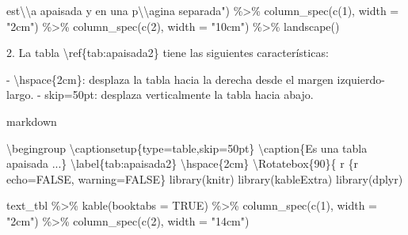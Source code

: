 \documentclass[11pt,a4paper,oneside,]{article}
\newenvironment{Shaded}{\begin{snugshade}}{\end{snugshade}}
\newcommand{\AttributeTok}[1]{\textcolor[rgb]{0.77,0.63,0.00}{#1}}
\newcommand{\DecValTok}[1]{\textcolor[rgb]{0.00,0.00,0.81}{#1}}
\newcommand{\FloatTok}[1]{\textcolor[rgb]{0.00,0.00,0.81}{#1}}
\newcommand{\NormalTok}[1]{#1}
\newcommand{\OtherTok}[1]{\textcolor[rgb]{0.56,0.35,0.01}{#1}}
\newcommand{\SpecialCharTok}[1]{\textcolor[rgb]{0.00,0.00,0.00}{#1}}
\newcommand{\StringTok}[1]{\textcolor[rgb]{0.31,0.60,0.02}{#1}}
\numberwithin{dummy}{section}
\theoremstyle{ocrenumbox}
\theoremstyle{blacknumex}
\theoremstyle{blacknumbox}
\theoremstyle{ocrenum}
\theoremstyle{ocrenum}
\begin{document}
\begin{Shaded}
\begin{Highlighting}[numbers=left,,]
\AttributeTok{          est}\SpecialCharTok{\textbackslash{}\textbackslash{}}\AttributeTok{\textquotesingle{}a apaisada y en una p}\SpecialCharTok{\textbackslash{}\textbackslash{}}\AttributeTok{\textquotesingle{}agina separada") \%\textgreater{}\% }
\AttributeTok{      column\_spec(c(1), }
\AttributeTok{          width = "2cm") \%\textgreater{}\% }
\AttributeTok{      column\_spec(c(2), }
\AttributeTok{          width = "10cm") \%\textgreater{}\% }
\AttributeTok{      landscape()}
\StringTok{\textasciigrave{}\textasciigrave{}\textasciigrave{}}
\end{Highlighting}
\end{Shaded}

\begin{Shaded}
\begin{Highlighting}[numbers=left,,firstnumber=701,]
\StringTok{\textasciigrave{}\textasciigrave{}\textasciigrave{}\textasciigrave{}}


\FloatTok{2.}\NormalTok{ La tabla \textbackslash{}ref\{tab}\SpecialCharTok{:}\NormalTok{apaisada2\} tiene las siguientes características}\SpecialCharTok{:}

    \SpecialCharTok{{-}} \StringTok{\textasciigrave{}}\AttributeTok{\textbackslash{}hspace\{2cm\}}\StringTok{\textasciigrave{}}\SpecialCharTok{:}\NormalTok{ desplaza la tabla hacia la derecha desde el margen izquierdo}\SpecialCharTok{{-}}\NormalTok{largo.}
    \SpecialCharTok{{-}} \StringTok{\textasciigrave{}}\AttributeTok{skip=50pt}\StringTok{\textasciigrave{}}\SpecialCharTok{:}\NormalTok{ desplaza verticalmente la tabla hacia abajo.}

\StringTok{\textasciigrave{}\textasciigrave{}\textasciigrave{}\textasciigrave{}}\NormalTok{markdown}

\NormalTok{\textbackslash{}begingroup}
\NormalTok{\textbackslash{}captionsetup\{type}\OtherTok{=}\NormalTok{table,skip}\OtherTok{=}\NormalTok{50pt\}}
\NormalTok{\textbackslash{}caption\{Es una tabla apaisada ...\} \textbackslash{}label\{tab}\SpecialCharTok{:}\NormalTok{apaisada2\}}
\NormalTok{\textbackslash{}hspace\{2cm\}}
\NormalTok{\textbackslash{}Rotatebox\{}\DecValTok{90}\NormalTok{\}\{}
\StringTok{\textasciigrave{}}\AttributeTok{r \textquotesingle{}\textquotesingle{}}\StringTok{\textasciigrave{}\textasciigrave{}\textasciigrave{}\textasciigrave{}}\AttributeTok{\{r echo=FALSE, warning=FALSE\}}
\AttributeTok{library(knitr)}
\AttributeTok{library(kableExtra)}
\AttributeTok{library(dplyr)}

\AttributeTok{text\_tbl \%\textgreater{}\%}
\AttributeTok{  kable(booktabs = TRUE) \%\textgreater{}\% }
\AttributeTok{      column\_spec(c(1), width = "2cm") \%\textgreater{}\% }
\AttributeTok{      column\_spec(c(2), width = "14cm")}


\end{Highlighting}
\end{Shaded}
\end{document}
